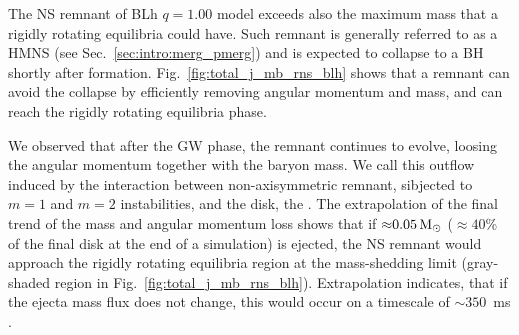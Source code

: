 The \ac{NS} remnant of BLh $q=1.00$ model exceeds also the maximum mass 
that a rigidly rotating 
equilibria could have. Such remnant is generally referred to as a \ac{HMNS}
(see Sec.~\ref{sec:intro:merg_pmerg}) \citep{Baumgarte:1999cq} 
and is expected to collapse to a \ac{BH} shortly after formation. 
Fig.~\ref{fig:total_j_mb_rns_blh} shows that a remnant can avoid the collapse by 
efficiently removing angular momentum and mass, and can reach the rigidly rotating equilibria phase.%
%
%

We observed that after the \ac{GW} phase, the remnant continues to evolve, loosing the 
angular momentum together with the baryon mass. 
We call this outflow induced by the interaction between non-axisymmetric 
remnant, sibjected to $m=1$ and $m=2$ instabilities, and the disk, 
the \swind{}. 
%
The extrapolation of the final trend of the mass and angular momentum loss shows that 
if ${\approx}0.05\,{\text{M}_{\odot}}$ (${\approx}40$\% of the final disk at the end of a  simulation) is 
ejected, the \ac{NS} remnant would approach the rigidly rotating equilibria region 
at the mass-shedding limit (gray-shaded region in Fig.~\ref{fig:total_j_mb_rns_blh}). 
Extrapolation indicates, that if the ejecta mass flux does 
not change, this would occur on a timescale of ${\sim}350$~ms \pmerg{}.
%

